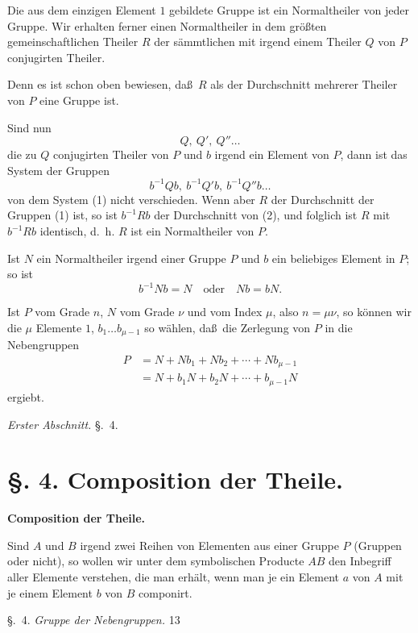 \documentclass[12pt,a4paper]{book}
\begin{document}
Die aus dem einzigen Element $1$ gebildete Gruppe ist ein Normaltheiler von jeder Gruppe. Wir erhalten ferner einen Normaltheiler in dem gr\"o\ss ten gemeinschaftlichen Theiler $R$ der s\"ammtlichen mit irgend einem Theiler $Q$ von $P$ conjugirten Theiler.

Denn es ist schon oben bewiesen, da\ss\ $R$ als der Durchschnitt mehrerer Theiler von $P$ eine Gruppe ist.

Sind nun
\[Q,\ Q',\ Q'' \ldots\]
die zu $Q$ conjugirten Theiler von $P$ und $b$ irgend ein Element von $P$, dann ist das System der Gruppen
\[b^{-1}Qb,\ b^{-1}Q'b,\ b^{-1}Q''b \ldots\]
von dem System (1) nicht verschieden. Wenn aber $R$ der Durchschnitt der Gruppen (1) ist, so ist $b^{-1}Rb$ der Durchschnitt von (2), und folglich ist $R$ mit $b^{-1}Rb$ identisch, d.~h. $R$ ist ein Normaltheiler von $P$.

Ist $N$ ein Normaltheiler irgend einer Gruppe $P$ und $b$ ein beliebiges Element in $P$; so ist
\[b^{-1}Nb = N \quad \text{oder} \quad Nb = bN.\]

Ist $P$ vom Grade $n$, $N$ vom Grade $\nu$ und vom Index $\mu$, also $n = \mu\nu$, so k\"onnen wir die $\mu$ Elemente $1$, $b_1 \ldots b_{\mu-1}$ so w\"ahlen, da\ss\ die Zerlegung von $P$ in die Nebengruppen
\begin{align*}
P &= N + Nb_1 + Nb_2 + \cdots + Nb_{\mu-1} \\
  &= N + b_1N + b_2N + \cdots + b_{\mu-1}N
\end{align*}
ergiebt.

\newpage
{} \hfill \textit{Erster Abschnitt.} \hfill \S.~4.

\vspace{0.3cm}

\section*{\S. 4. Composition der Theile.}

\begin{center}
\textbf{Composition der Theile.}
\end{center}

Sind $A$ und $B$ irgend zwei Reihen von Elementen aus einer Gruppe $P$ (Gruppen oder nicht), so wollen wir unter dem symbolischen Producte $AB$ den Inbegriff aller Elemente verstehen, die man erh\"alt, wenn man je ein Element $a$ von $A$ mit je einem Element $b$ von $B$ componirt.

\newpage
\noindent\S.~4. \hfill \textit{Gruppe der Nebengruppen.} \hfill 13
\end{document}
